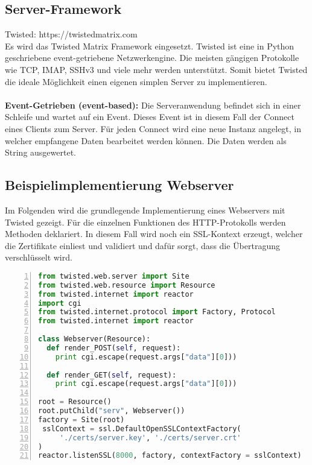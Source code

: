 \subsection{Server-Framework}
Twisted: https://twistedmatrix.com \\
Es wird das Twisted Matrix Framework eingesetzt. Twisted ist eine in Python geschriebene event-getriebene Netzwerkengine. Die meisten gängigen Protokolle wie TCP, IMAP, SSHv3 und viele mehr werden unterstützt. Somit bietet Twisted die ideale Möglichkeit einen eigenen simplen Server zu implementieren. \\\\
\textbf{Event-Getrieben (event-based):} Die Serveranwendung befindet sich in einer Schleife und wartet auf ein Event. Dieses Event ist in diesem Fall der Connect eines Clients zum Server. Für jeden Connect wird eine neue Instanz angelegt, in welcher empfangene Daten bearbeitet werden können. Die Daten werden als String ausgewertet.

\subsection{Beispielimplementierung Webserver}
Im Folgenden wird die grundlegende Implementierung eines Webservers mit Twisted gezeigt. Für die einzelnen Funktionen des HTTP-Protokolls werden Methoden deklariert. In diesem Fall wird noch ein SSL-Kontext erzeugt, welcher die Zertifikate einliest und validiert und dafür sorgt, dass die Übertragung verschlüsselt wird.

\begin{lstlisting}[caption =Testcode Echoserver mit Twisted Framework, language=python, frame=single, breaklines=true,columns=fullflexible, commentstyle=\color{gray}\upshape, captionpos=b, numbers = left]
from twisted.web.server import Site
from twisted.web.resource import Resource
from twisted.internet import reactor
import cgi
from twisted.internet.protocol import Factory, Protocol
from twisted.internet import reactor

class Webserver(Resource):
  def render_POST(self, request):
	print cgi.escape(request.args["data"][0]))

  def render_GET(self, request):
	print cgi.escape(request.args["data"][0]))

root = Resource()
root.putChild("serv", Webserver())
factory = Site(root)
 sslContext = ssl.DefaultOpenSSLContextFactory(
     './certs/server.key', './certs/server.crt'
)
reactor.listenSSL(8000, factory, contextFactory = sslContext)
\end{lstlisting}




